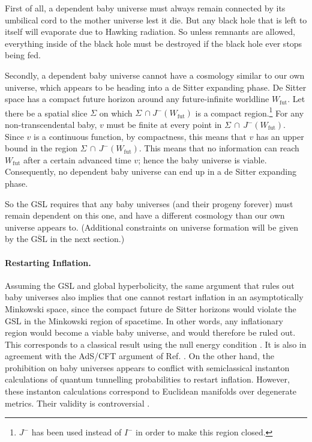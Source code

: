 \documentclass[12pt]{article}
\begin{document}
First of all, a dependent baby universe must always remain connected by its umbilical cord to the mother universe lest it die.  But any black hole that is left to itself will evaporate due to Hawking radiation.  So unless remnants are allowed, everything inside of the black hole must be destroyed if the black hole ever stops being fed.

Secondly, a dependent baby universe cannot have a cosmology similar to our own universe, which appears to be heading into a de Sitter expanding phase.  De Sitter space has a compact future horizon around any future-infinite worldline $W_\mathrm{fut}$.  Let there be a spatial slice $\Sigma$ on which $\Sigma\,\cap J^-(W_\mathrm{fut})$ is a compact region.\footnote{$J^-$ has been used instead of $I^-$ in order to make this region closed.}  For any non-transcendental baby, $v$ must be finite at every point in $\Sigma\,\cap\,J^-(W_\mathrm{fut})$.  Since $v$ is a continuous function, by compactness, this means that $v$ has an upper bound in the region $\Sigma\,\cap\,J^-(W_\mathrm{fut})$.  This means that no information can reach $W_\mathrm{fut}$ after a certain advanced time $v$; hence the baby universe is viable.  Consequently, no dependent baby universe can end up in a de Sitter expanding phase.

So the GSL requires that any baby universes (and their progeny forever) must remain dependent on this one, and have a different cosmology than our own universe appears to.  (Additional constraints on universe formation will be given by the $\overline{\mathrm{GSL}}$ in the next section.)

\paragraph{Restarting Inflation.} Assuming the GSL and global hyperbolicity, the same argument that rules out baby universes also implies that one cannot restart inflation in an asymptotically Minkowski space, since the compact future de Sitter horizons would violate the GSL in the Minkowski region of spacetime.  In other words, any inflationary region would become a viable baby universe, and would therefore be ruled out.  This corresponds to a classical result using the null energy condition \cite{obstacle}.  It is also in agreement with the AdS/CFT argument of Ref. \cite{myers}.  On the other hand, the prohibition on baby universes appears to conflict with semiclassical instanton calculations \cite{bubble} of quantum tunnelling probabilities to restart inflation.  However, these instanton calculations correspond to Euclidean manifolds over degenerate metrics.  Their validity is controversial \cite{banks}.
\end{document}
